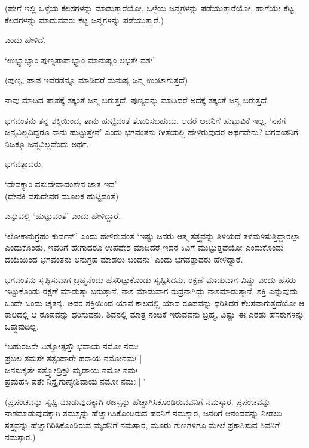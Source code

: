 (ಹೇಗೆ ಇಲ್ಲಿ ಒಳ್ಳೆಯ ಕೆಲಸಗಳನ್ನು ಮಾಡುತ್ತಾರೆಯೋ, ಒಳ್ಳೆಯ ಜನ್ಮಗಳನ್ನು ಪಡೆಯುತ್ತಾರೆಯೋ, ಹಾಗೆಯೇ ಕೆಟ್ಟ ಕೆಲಸಗಳನ್ನು ಮಾಡುವವರು ಕೆಟ್ಟ ಜನ್ಮಗಳನ್ನು ಪಡೆಯುತ್ತಾರೆ.)

ಎಂದು ಹೇಳಿದೆ,

\begin{shloka}
`ಉಭ್ಯಾಭ್ಯಾಂ ಪುಣ್ಯಪಾಪಾಭ್ಯಾಂ ಮಾನುಷ್ಯಂ ಲಭತೇ ವಶಃ'
\end{shloka}

(ಪುಣ್ಯ, ಪಾಪ ಇವೆರಡನ್ನೂ ಮಾಡಿದರೆ ಮನುಷ್ಯ ಜನ್ಮ ಉಂಟಾಗುತ್ತದೆ)

ನಾವು ಮಾಡಿದ ಪಾಪಕ್ಕೆ ತಕ್ಕಂತೆ ಜನ್ಮ ಬರುತ್ತದೆ. ಪುಣ್ಯವನ್ನು ಮಾಡಿದರೆ ಅದಕ್ಕೆ ತಕ್ಕಂತೆ ಜನ್ಮ ಬರುತ್ತದೆ.

ಭಗವಂತನು ತನ್ನ ಶಕ್ತಿಯಿಂದ, ತಾನು ಹುಟ್ಟಿದಂತೆ ತೋರಿಸಬಹುದು. ಆದರೆ ಅವನಿಗೆ ಹುಟ್ಟುವಿಕೆ ಇಲ್ಲ. `ನನಗೆ ಜನ್ಮವಿಲ್ಲದಿದ್ದರೂ ನಾನು ಹುಟ್ಟುತ್ತೇನೆ' ಎಂದು ಭಗವಂತನು ಗೀತೆಯಲ್ಲಿ ಹೇಳಿರುವುದರ ಅರ್ಥವೇನು? ಭಗವಂತನಿಗೆ ನಿಜಕ್ಕೂ ಜನ್ಮವಿಲ್ಲವೆಂದು ಅರ್ಥ.

ಭಗವತ್ಪಾದರು,

\begin{shloka}
`ದೇವಕ್ಯಾಂ ವಸುದೇವಾದಂಶೇನ ಜಾತ ಇವ'\\
(ದೇವಕಿ-ವಸುದೇವರ ಮೂಲಕ ಹುಟ್ಟಿದಂತೆ)
\end{shloka}

ಎನ್ನುವಲ್ಲಿ `ಹುಟ್ಟುವಂತೆ' ಎಂದು ಹೇಳಿದ್ದಾರೆ.

`ಲೋಕಾನುಗ್ರಹಂ ಕುರ್ವನ್' ಎಂದು ಹೇಳಿರುವಂತೆ `ಇಷ್ಟು ಜನರು ಆತ್ಮ ತತ್ತ್ವವನ್ನು ತಿಳಿಯದೆ ತಳಮಳಿಸುತ್ತಿದ್ದಾರಲ್ಲಾ ಎಂದುಕೊಂಡು, ಇವರಿಗೆ ಹೇಗಾದರೂ ಉಪದೇಶ ಮಾಡಿದರೆ ಇದರ ಕಿವಿಗೆ ಮುಟ್ಟುತ್ತದೆಯೋ ಎಂದುಕೊಂಡು ದಯೆಯಿಂದ ಭಗವಂತನು ಅನುಗ್ರಹ ಮಾಡಲು ಬಂದನು' ಎಂದು ಭಗವತ್ಪಾದರು ಹೇಳಿದ್ದಾರೆ.


ಭಗವಂತನು ಸೃಷ್ಟಿಸುವಾಗ ಬ್ರಹ್ಮನೆಂದು ಹೆಸರಿಟ್ಟುಕೊಂಡು ಸೃಷ್ಟಿಸಿದನು. ರಕ್ಷಣೆ ಮಾಡುವಾಗ ವಿಷ್ಣು ಎಂದು ಹೆಸರು ಇಟ್ಟುಕೊಂಡು ರಕ್ಷಣೆ ಮಾಡುತ್ತಾ ಬರುತ್ತಾನೆ. ನಾಶ ಮಾಡುವಾಗ ರುದ್ರನಾಗಿದ್ದು ನಾಶಮಾಡುತ್ತಾನೆ. ಶಕ್ತಿ ಎನ್ನುವುದು ಒಂದೇ ಒಂದು ಚೈತನ್ಯ. ಅದರ ಶಕ್ತಿಯಿಂದ ಯಾವ ಕಾಲದಲ್ಲಿ ಯಾವ ರೂಪವನ್ನು ಧರಿಸಿದರೆ ಕೆಲಸವಾಗುತ್ತದೆಯೋ ಆ ಕಾಲದಲ್ಲಿ ಆ ರೂಪವನ್ನು ಧರಿಸುವನು. ಶಿವನಲ್ಲಿ ಮಾತ್ರ ನಂಬಿಕೆ ಇರುವವನು ಬ್ರಹ್ಮ, ವಿಷ್ಣು ಈ ಎರಡು ಹೆಸರುಗಳನ್ನು ಒಪ್ಪುವುದಿಲ್ಲ.


\begin{shloka}
`ಬಹುರಜಸೇ ವಿಶ್ವೋತ್ಪತ್ತೌ ಭವಾಯ ನಮೋ ನಮಃ\\
ಪ್ರಬಲ ತಮಸೇ ತತ್ಸಂಹಾರೇ ಹರಾಯ ನಮೋನಮಃ‌ |\\
ಜನಸುಕೃತೇ ಸತ್ತ್ವೋದ್ರಿಕ್ತೌ ಮೃಡಾಯ ನಮೋ ನಮಃ\\
ಪ್ರಮಹಸಿ ಪತೇ ನಿಸ್ತ್ರೈಗುಣ್ಯೇಶಿವಾಯ ನಮೋ ನಮಃ ||'
\end{shloka}

(ಪ್ರಪಂಚವನ್ನು ಸೃಷ್ಟಿ ಮಾಡುವುದಕ್ಕಾಗಿ ರಜಸ್ಸನ್ನು ಹೆಚ್ಚಾಗಿಸಿಕೊಂಡಿರುವವನಿಗೆ ನಮಸ್ಕಾರ. ಪ್ರಪಂಚವನ್ನು ನಾಶಮಾಡುವುದಕ್ಕಾಗಿ ತಮಸ್ಸನ್ನು ಹೆಚ್ಚಾಗಿಸಿಕೊಂಡಿರುವ ಹರನಿಗೆ ನಮಸ್ಕಾರ, ಜನರಿಗೆ ಆನಂದವನ್ನು ನೀಡಲು ಸತ್ತ್ವವನ್ನು ಹೆಚ್ಚಾಗಿರಿಸಿಕೊಂಡಿರುವ ಮೃಡನಿಗೆ ನಮಸ್ಕಾರ, ಮೂರು ಗುಣಗಳಿಗೂ ಮೇಲೆ ಪ್ರಕಾಶಿಸುವ ಶಿವನಿಗೆ ನಮಸ್ಕಾರ.)


